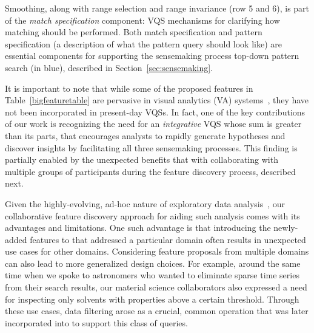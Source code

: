  Smoothing, along with range selection and range invariance (row 5 and 6), is part of the \emph{match specification} component: VQS mechanisms for clarifying how matching should be performed. Both match specification and pattern specification (a description of what the pattern query should look like) are essential components for supporting the sensemaking process top-down pattern search (in blue), described in Section~\ref{sec:sensemaking}.
 \par It is important to note that while some of the proposed features in Table~\ref{bigfeaturetable} are pervasive in  visual analytics (VA) systems~\cite{Heer2012,Amar2005}, they have not been incorporated in present-day VQSs. In fact, one of the key contributions of our work is recognizing the need for an \emph{integrative} VQS whose sum is greater than its parts, that encourages analysts to rapidly generate hypotheses and discover insights by facilitating all three sensemaking processes. This finding is partially enabled by the unexpected benefits that  with collaborating with multiple groups of participants during the feature discovery process, described next.
 \par Given the highly-evolving, ad-hoc nature of exploratory data analysis~\cite{Keim2006,Tukey1970}, our collaborative feature discovery approach for aiding such analysis comes with its advantages and limitations. One such advantage is that introducing the newly-added features to \zvpp that addressed a particular domain often results in unexpected use cases for other domains. Considering feature proposals from multiple domains can also lead to more generalized design choices. For example, around the same time when we spoke to astronomers who wanted to eliminate sparse time series from their search results, our material science collaborators also expressed a need for inspecting only solvents with properties above a certain threshold. Through these use cases, data filtering arose as a crucial, common operation that was later incorporated into \zvpp to support this class of queries. %
